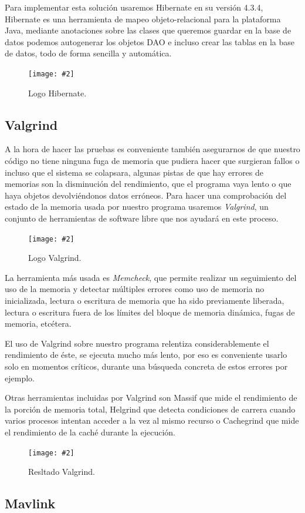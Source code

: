 \documentclass[12pt,a4paper,spanish]{book} %
\newcommand{\imgCentrada}[3]{
\begin{figure}[H]
\begin{center}
\texttt{[image: \#2]}
\caption{#3}
\label{#1}
\end{center}
\end{figure}
}
\newcommand{\imgCentradaMed}[3]{
\begin{figure}[H]
\begin{center}
\texttt{[image: \#2]}
\caption{#3}
\label{#1}
\end{center}
\end{figure}
}
\begin{document}
Para implementar esta solución usaremos Hibernate en su versión 4.3.4, Hibernate es una herramienta de mapeo objeto-relacional para la plataforma Java, mediante anotaciones sobre las clases que queremos guardar en la base de datos podemos autogenerar los objetos DAO e incluso crear las tablas en la base de datos, todo de forma sencilla y automática.

\imgCentradaMed{fig.2.19}{img/hibernate.eps}{Logo Hibernate.}

\subsection{Valgrind}

\lettrine{A}{} la hora de hacer las pruebas es conveniente también asegurarnos de que nuestro código no tiene ninguna fuga de memoria que pudiera hacer que surgieran fallos o incluso que el sistema se colapsara, algunas pistas de que hay errores de memorias son la disminución del rendimiento, que el programa vaya lento o que haya objetos devolviéndonos datos erróneos. Para hacer una comprobación del estado de la memoria usada por nuestro programa usaremos \emph{Valgrind}, un conjunto de herramientas de software libre que nos ayudará en este proceso. 

\imgCentradaMed{fig.2.20}{img/valgrind.eps}{Logo Valgrind.}

La herramienta más usada es \emph{Memcheck}, que permite realizar un seguimiento del uso de la memoria y detectar múltiples errores como uso de memoria no inicializada, lectura o escritura de memoria que ha sido previamente liberada, lectura o escritura fuera de los límites del bloque de memoria dinámica, fugas de memoria, etcétera.

El uso de Valgrind sobre nuestro programa relentiza considerablemente el rendimiento de éste, se ejecuta mucho más lento, por eso es conveniente usarlo solo en momentos críticos, durante una búsqueda concreta de estos errores por ejemplo.

\newpage
Otras herramientas incluidas por Valgrind son Massif que mide el rendimiento de la porción de memoria total, Helgrind que detecta condiciones de carrera cuando varios procesos intentan acceder a la vez al mismo recurso o Cachegrind que mide el rendimiento de la caché durante la ejecución.

\imgCentrada{fig.2.21}{img/valgrindreport.eps}{Resltado Valgrind.}

\newpage
\subsection{Mavlink}
\end{document}
